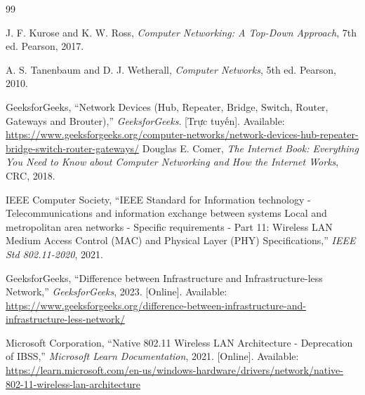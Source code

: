 \begin{thebibliography}{99}

    J. F. Kurose and K. W. Ross, \textit{Computer Networking: A Top-Down Approach}, 7th ed. Pearson, 2017.

    A. S. Tanenbaum and D. J. Wetherall, \textit{Computer Networks}, 5th ed. Pearson, 2010.

    GeeksforGeeks, ``Network Devices (Hub, Repeater, Bridge, Switch, Router, Gateways and Brouter),'' \textit{GeeksforGeeks}. [Trực tuyến]. Available: \url{https://www.geeksforgeeks.org/computer-networks/network-devices-hub-repeater-bridge-switch-router-gateways/}
    Douglas E. Comer, \textit{The Internet Book: Everything You Need to Know about Computer Networking and How the Internet Works}, CRC, 2018.

    IEEE Computer Society, ``IEEE Standard for Information technology - Telecommunications and information exchange between systems Local and metropolitan area networks - Specific requirements - Part 11: Wireless LAN Medium Access Control (MAC) and Physical Layer (PHY) Specifications,'' \textit{IEEE Std 802.11-2020}, 2021.

    GeeksforGeeks, ``Difference between Infrastructure and Infrastructure-less Network,'' \textit{GeeksforGeeks}, 2023. [Online]. Available: \url{https://www.geeksforgeeks.org/difference-between-infrastructure-and-infrastructure-less-network/}

    Microsoft Corporation, ``Native 802.11 Wireless LAN Architecture - Deprecation of IBSS,'' \textit{Microsoft Learn Documentation}, 2021. [Online]. Available: \url{https://learn.microsoft.com/en-us/windows-hardware/drivers/network/native-802-11-wireless-lan-architecture}
    
\end{thebibliography}